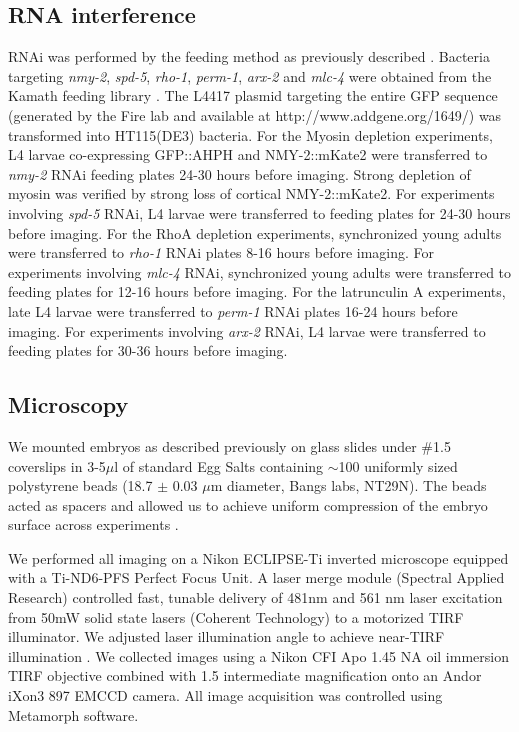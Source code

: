 \subsection{RNA interference}
RNAi was performed by the feeding method as previously described \cite{Timmons:2001wg}.  Bacteria targeting \textit{nmy-2}, \textit{spd-5}, \textit{rho-1}, \textit{perm-1}, \textit{arx-2} and \textit{mlc-4} were obtained from the Kamath feeding library \cite{Kamath:2003bk}. The L4417 plasmid targeting the entire GFP sequence (generated by the Fire lab and available at http://www.addgene.org/1649/) was transformed into HT115(DE3) bacteria. For the Myosin depletion experiments, L4 larvae co-expressing GFP::AHPH and NMY-2::mKate2  were transferred to \textit{nmy-2} RNAi feeding plates 24-30 hours before imaging. Strong depletion of myosin was verified by strong loss of cortical NMY-2::mKate2. For experiments involving \textit{spd-5} RNAi, L4 larvae were transferred to feeding plates for 24-30 hours before imaging. For the RhoA depletion experiments, synchronized young adults were transferred to \textit{rho-1} RNAi plates 8-16 hours before imaging. For experiments involving \textit{mlc-4} RNAi, synchronized young adults were transferred to feeding plates for 12-16 hours before imaging. For the latrunculin A experiments, late L4 larvae were transferred to \textit{perm-1} RNAi plates 16-24 hours before imaging. For experiments involving \textit{arx-2} RNAi, L4 larvae were transferred to feeding plates for 30-36 hours before imaging.


\subsection{Microscopy}
We mounted embryos as described previously \cite{Robin:2014jf} on glass slides under \#1.5 coverslips in 3-5$\mu$l of standard Egg Salts containing $\sim$100 uniformly sized polystyrene beads (18.7 $\pm$ 0.03 $\mu$m diameter, Bangs labs, NT29N).  The beads acted as spacers and allowed us to achieve uniform compression of the embryo surface across experiments \cite{Robin:2014jf}.

We performed all imaging on a Nikon ECLIPSE-Ti inverted microscope equipped with a Ti-ND6-PFS Perfect Focus Unit. A laser merge module (Spectral Applied Research) controlled fast, tunable delivery of  481nm and 561 nm laser excitation from 50mW solid state lasers (Coherent Technology) to a motorized TIRF illuminator. We adjusted laser illumination angle to achieve near-TIRF illumination \cite{Tokunaga:2008kc}. We collected images using a Nikon CFI Apo 1.45 NA oil immersion TIRF objective combined with 1.5 intermediate magnification onto an Andor iXon3 897 EMCCD camera. All image acquisition was controlled using Metamorph software.



